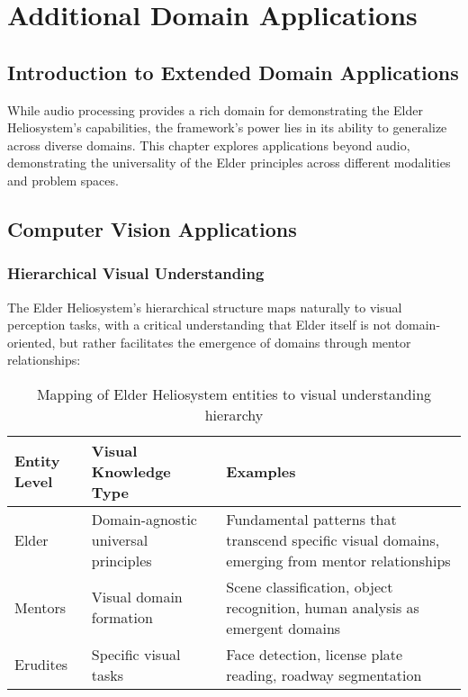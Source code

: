 \chapter{Additional Domain Applications}

\section{Introduction to Extended Domain Applications}

While audio processing provides a rich domain for demonstrating the Elder Heliosystem's capabilities, the framework's power lies in its ability to generalize across diverse domains. This chapter explores applications beyond audio, demonstrating the universality of the Elder principles across different modalities and problem spaces.

\section{Computer Vision Applications}

\subsection{Hierarchical Visual Understanding}

The Elder Heliosystem's hierarchical structure maps naturally to visual perception tasks, with a critical understanding that Elder itself is not domain-oriented, but rather facilitates the emergence of domains through mentor relationships:

\begin{table}[h]
\centering
\begin{tabular}{p{3cm} | p{5cm} | p{6cm}}
\textbf{Entity Level} & \textbf{Visual Knowledge Type} & \textbf{Examples} \\
\hline
Elder & Domain-agnostic universal principles & Fundamental patterns that transcend specific visual domains, emerging from mentor relationships \\
\hline
Mentors & Visual domain formation & Scene classification, object recognition, human analysis as emergent domains \\
\hline
Erudites & Specific visual tasks & Face detection, license plate reading, roadway segmentation \\
\end{tabular}
\caption{Mapping of Elder Heliosystem entities to visual understanding hierarchy}
\end{table}

